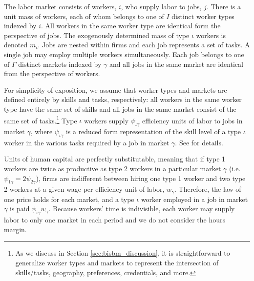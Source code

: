 \documentclass[12pt]{article}
\def\ig{\iota\gamma}
\def\g{\gamma}
\def\i{\iota}
\theoremstyle{definition}
\theoremstyle{plain}
\begin{document}
The labor market consists of workers, $i$, who supply labor to jobs, $j$. There is a unit mass of workers, each of whom belongs to one of $I$ distinct worker types indexed by $i$. All workers in the same worker type are identical form the perspective of jobs. The exogenously determined mass of type $\i$ workers is denoted $m_{\i}$. Jobs are nested within firms and each job represents a set of tasks. A single job may employ multiple workers simultaneously. Each job belongs to one of $\Gamma$ distinct markets indexed by $\g$ and all jobs in the same market are identical from the perspective of workers.

For simplicity of exposition, we assume that worker types and markets are defined entirely by skills and tasks, respectively: all workers in the same worker type have the same set of skills and all jobs in the same market consist of the same set of tasks.\footnote{As we discuss in Section \ref{sec:bisbm_discussion}, it is straightforward to generalize worker types and markets to represent the intersection of skills/tasks, geography, preferences, credentials, and more.} Type $\i$ workers supply $\psi_{\ig}$ efficiency units of labor to jobs in market $\g$, where $\psi_{\ig}$ is a reduced form representation of the skill level of a type $\i$ worker in the various tasks required by a job in market $\g$. See \citet{Grigsby2022} for details.

Units of human capital are perfectly substitutable, meaning that if type 1 workers are twice as productive as type 2 workers in a particular market $\g$ (i.e. $\psi_{1\g} = 2\psi_{2\g}$), firms are indifferent between hiring one type 1 worker and two type 2 workers at a given wage per efficiency unit of labor, $w_{\g}$. Therefore, the law of one price holds for each market, and a type $\i$ worker employed in a job in market $\g$ is paid $\psi_{\ig}w_{\g}$. Because workers' time is indivisible, each worker may supply labor to only one market in each period and we do not consider the hours margin.
\end{document}
